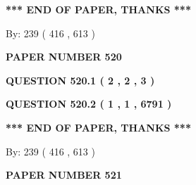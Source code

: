 \documentclass[12pt]{article}
\begin{document}
   
   
   
   
\vspace{1.0in} 
{\textbf{\large{ *** END OF PAPER, THANKS *** }}} 
   
   
\hspace{1.0in} By: 
 239 ( 416 ,  613 )
   
   
   
   
\newpage 
\setcounter{page}{ 
   520001 } 
   
   
   
   
 {\textbf{ \Large{ PAPER NUMBER  520  }}}
   
   
\vspace{0.2in}
   
   
   
   
   
   
 \vspace{0.2in}
 
 
 
 
   
   
  
\vspace{0.2in}
  
{\textbf{\Large{QUESTION
520.1 
 ( 2 , 2 , 3 )
}}}
  
  
  
\vspace{0.2in}
  
{\textbf{\Large{QUESTION
520.2 
 ( 1 , 1 , 6791 )
}}}
  
  
   
   
 \vspace{0.2in}
 
   
   
   
   
\vspace{1.0in} 
{\textbf{\large{ *** END OF PAPER, THANKS *** }}} 
   
   
\hspace{1.0in} By: 
 239 ( 416 ,  613 )
   
   
   
   
\newpage 
\setcounter{page}{ 
   521001 } 
   
   
   
   
 {\textbf{ \Large{ PAPER NUMBER  521  }}}
   
   
\vspace{0.2in}
   
\end{document}
